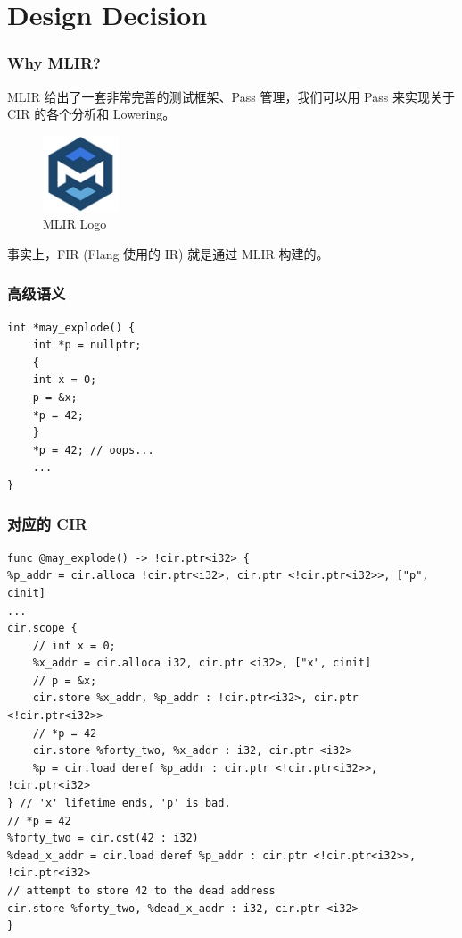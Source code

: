 \section{Design Decision}

\begin{frame}
    \frametitle{Why MLIR?}

    MLIR 给出了一套非常完善的测试框架、Pass 管理，我们可以用 Pass 来实现关于
    CIR 的各个分析和 Lowering。

    \begin{figure}
        \centering
        \includegraphics[width=0.2\textwidth]{images/mlir-logo.png}
        \caption{MLIR Logo}
    \end{figure}

    事实上，FIR (Flang 使用的 IR) 就是通过 MLIR 构建的。

\end{frame}


\begin{frame}[fragile]
    \frametitle{高级语义}
    \begin{center}
        \begin{minipage}{0.5\textwidth}
            \begin{lstlisting}[caption=一个简单的生命周期分析例子]
int *may_explode() {
    int *p = nullptr;
    {
    int x = 0;
    p = &x;
    *p = 42;
    }
    *p = 42; // oops...
    ...
}
            \end{lstlisting}
        \end{minipage}
    \end{center}

\end{frame}

\begin{frame}[fragile]
    \frametitle{对应的 CIR}
    \begin{center}
        \begin{minipage}{1.0\textwidth}
            \begin{lstlisting}
func @may_explode() -> !cir.ptr<i32> {
%p_addr = cir.alloca !cir.ptr<i32>, cir.ptr <!cir.ptr<i32>>, ["p", cinit]
...
cir.scope {
    // int x = 0;
    %x_addr = cir.alloca i32, cir.ptr <i32>, ["x", cinit]
    // p = &x;
    cir.store %x_addr, %p_addr : !cir.ptr<i32>, cir.ptr <!cir.ptr<i32>>
    // *p = 42
    cir.store %forty_two, %x_addr : i32, cir.ptr <i32>
    %p = cir.load deref %p_addr : cir.ptr <!cir.ptr<i32>>, !cir.ptr<i32>
} // 'x' lifetime ends, 'p' is bad.
// *p = 42
%forty_two = cir.cst(42 : i32)
%dead_x_addr = cir.load deref %p_addr : cir.ptr <!cir.ptr<i32>>, !cir.ptr<i32>
// attempt to store 42 to the dead address
cir.store %forty_two, %dead_x_addr : i32, cir.ptr <i32>
}
            \end{lstlisting}
        \end{minipage}
    \end{center}

\end{frame}


